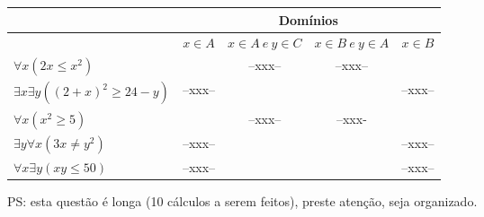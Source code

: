\documentclass[a4paper,11pt]{article}
\begin{document}
\begin{enumerate}
\begin{center}
\begin{tabular}{l|c|c|c|c} \hline \hline
 & \multicolumn{4}{c}{Domínios} \\ \hline
 & $ x \in A$ & $x \in A ~e~ y \in C$ & $x \in B ~e~ y \in A$ & $x \in B$ \\ \hline

$\forall x (2x \leq x^2)$ & & --xxx-- & --xxx--  & \\ \hline
$\exists x \exists y ((2+x)^2 \geq 24 - y)$ &  --xxx-- & & & --xxx-- \\ \hline
$\forall x (x^2 \geq 5)$ & & --xxx-- & --xxx-  & \\ \hline
$\exists y \forall x (3x \neq y^2)$ & --xxx-- &  & & --xxx-- \\ \hline
$\forall x \exists y (xy \leq 50)$ & --xxx-- &  & & --xxx-- \\ \hline \hline
\end{tabular}
\end{center}
PS: esta questão é longa (10 cálculos a serem feitos), preste atenção, seja organizado.




\end{enumerate}
\end{document}
